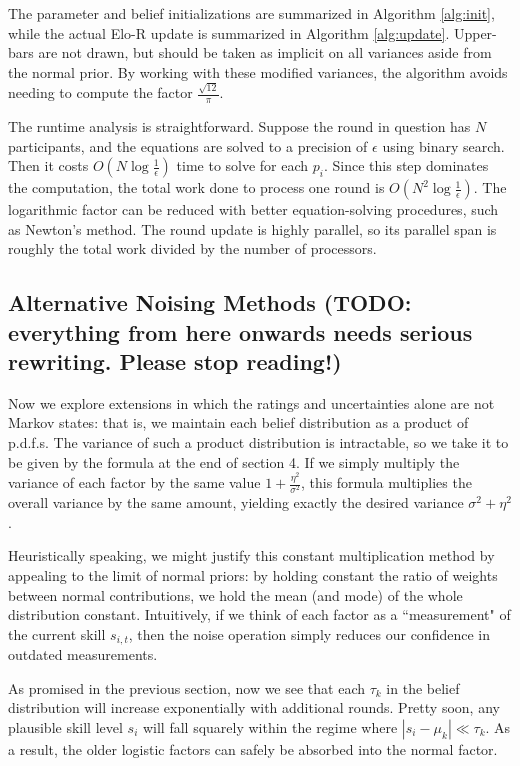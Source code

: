 The parameter and belief initializations are summarized in Algorithm \ref{alg:init}, while the actual Elo-R update is summarized in Algorithm \ref{alg:update}. Upper-bars are not drawn, but should be taken as implicit on all variances aside from the normal prior. By working with these modified variances, the algorithm avoids needing to compute the factor $\frac{\sqrt{12}}{\pi}$.

The runtime analysis is straightforward. Suppose the round in question has $N$ participants, and the equations are solved to a precision of $\epsilon$ using binary search. Then it costs $O(N\log\frac 1\epsilon)$ time to solve for each $p_i$. Since this step dominates the computation, the total work done to process one round is $O(N^2\log\frac 1\epsilon)$. The logarithmic factor can be reduced with better equation-solving procedures, such as Newton's method. The round update is highly parallel, so its parallel span is roughly the total work divided by the number of processors.

\subsection{Alternative Noising Methods (TODO: everything from here onwards needs serious rewriting. Please stop reading!)}

Now we explore extensions in which the ratings and uncertainties alone are not Markov states: that is, we maintain each belief distribution as a product of p.d.f.s. The variance of such a product distribution is intractable, so we take it to be given by the formula at the end of section 4. If we simply multiply the variance of each factor by the same value $1 + \frac{\eta^2}{\sigma^2}$, this formula multiplies the overall variance by the same amount, yielding exactly the desired variance $\sigma^2+\eta^2$.

Heuristically speaking, we might justify this constant multiplication method by appealing to the limit of normal priors: by holding constant the ratio of weights between normal contributions, we hold the mean (and mode) of the whole distribution constant. Intuitively, if we think of each factor as a ``measurement" of the current skill $s_{i,t}$, then the noise operation simply reduces our confidence in outdated measurements.

As promised in the previous section, now we see that each $\tau_k$ in the belief distribution will increase exponentially with additional rounds. Pretty soon, any plausible skill level $s_i$ will fall squarely within the regime where $|s_i-\mu_k| \ll \tau_k$. As a result, the older logistic factors can safely be absorbed into the normal factor.

